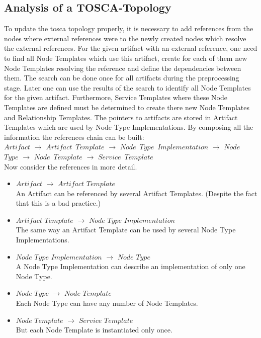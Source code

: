\subsection{Analysis of a TOSCA-Topology}\label{subs:analyse}
To update the \gls{tosca} topology properly, it is necessary to add references from the nodes where external references were to the newly created nodes which resolve the external references. 
For the given artifact with an external reference, one need to find all Node Templates which use this artifact, create for each of them new Node Templates resolving the reference and define the dependencies between them.
The search can be done once for all artifacts during the preprocessing stage.
Later one can use the results of the search to identify all Node Templates for the given artifact.
Furthermore, Service Templates where these Node Templates are defined must be determined to create there new Node Templates and Relationship Templates.
The pointers to artifacts are stored in Artifact Templates which are used by Node Type Implementations.
By composing all the information the references chain can be built:\\
$Artifact$ $\rightarrow$ $Artifact$~$Template$ $\rightarrow$ $Node$~$Type$~$Implementation$ $\rightarrow$ $Node$~$Type$ $\rightarrow$ $Node$~$Template$ $\rightarrow$ $Service$~$Template$\\
Now consider the references in more detail. 
\begin{itemize}
	\item $Artifact$ $\rightarrow$ $Artifact$ $Template$\\
	An Artifact can be referenced by several Artifact Templates. (Despite the fact that this is a bad practice.)
	\item  $Artifact$ $Template$ $\rightarrow$ $Node$ $Type$ $Implementation$ \\
	The same way an Artifact Template can be used by several Node Type Implementations.
	\item $Node$ $Type$ $Implementation$ $\rightarrow$ $Node$ $Type$ \\
	A Node Type Implementation can describe an implementation of only one Node Type.
	\item  $Node$ $Type$ $\rightarrow$ $Node$ $Template$\\
	Each Node Type can have any number of Node Templates.
	\item  $Node$ $Template$ $\rightarrow$ $Service$ $Template$\\
	But each Node Template is instantiated only once.
\end{itemize}
